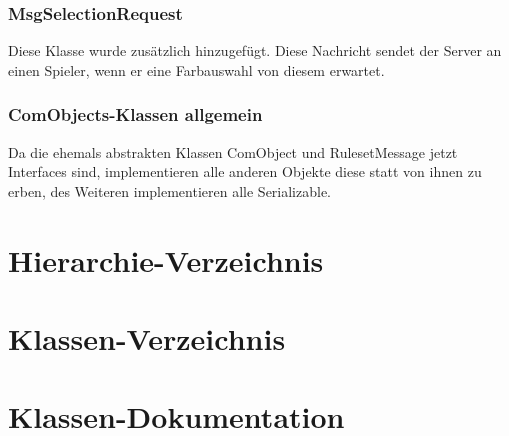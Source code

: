 \documentclass[twoside]{article}
\begin{document}
\subsubsection{MsgSelectionRequest}
Diese Klasse wurde zusätzlich hinzugefügt. Diese Nachricht sendet der Server an einen Spieler, wenn er eine Farbauswahl von diesem erwartet.
\subsubsection{ComObjects-Klassen allgemein}
Da die ehemals abstrakten Klassen ComObject und RulesetMessage jetzt Interfaces sind, implementieren alle anderen Objekte diese statt von ihnen zu erben, des Weiteren implementieren alle Serializable.


\section{Hierarchie-\/\-Verzeichnis}

\section{Klassen-\/\-Verzeichnis}

\section{Klassen-\/\-Dokumentation}














































































\end{document}

